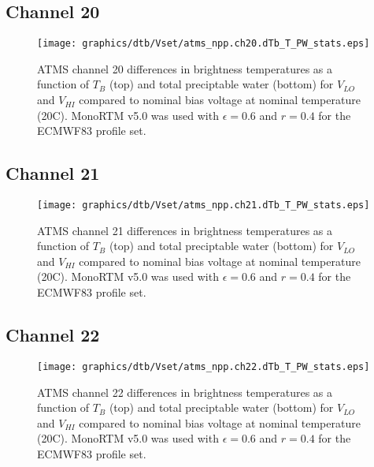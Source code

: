 \subsection{Channel 20}
\begin{figure}[H]
  \label{fig:Vset.ch20_dtb}
  \centering
  \hspace{1.5cm}\texttt{[image: graphics/dtb/Vset/atms\_npp.ch20.dTb\_T\_PW\_stats.eps]}
  \caption{ATMS channel 20 differences in brightness temperatures as a function of $T_B$ (top) and total preciptable water (bottom) for $V_{LO}$ and $V_{HI}$ compared to nominal bias voltage at nominal temperature (20\textdegree{}C). MonoRTM v5.0 was used with $\epsilon=0.6$ and $r=0.4$ for the ECMWF83 profile set.}
\end{figure}

\subsection{Channel 21}
\begin{figure}[H]
  \label{fig:Vset.ch21_dtb}
  \centering
  \hspace{1.5cm}\texttt{[image: graphics/dtb/Vset/atms\_npp.ch21.dTb\_T\_PW\_stats.eps]}
  \caption{ATMS channel 21 differences in brightness temperatures as a function of $T_B$ (top) and total preciptable water (bottom) for $V_{LO}$ and $V_{HI}$ compared to nominal bias voltage at nominal temperature (20\textdegree{}C). MonoRTM v5.0 was used with $\epsilon=0.6$ and $r=0.4$ for the ECMWF83 profile set.}
\end{figure}

\subsection{Channel 22}
\begin{figure}[H]
  \label{fig:Vset.ch22_dtb}
  \centering
  \hspace{1.5cm}\texttt{[image: graphics/dtb/Vset/atms\_npp.ch22.dTb\_T\_PW\_stats.eps]}
  \caption{ATMS channel 22 differences in brightness temperatures as a function of $T_B$ (top) and total preciptable water (bottom) for $V_{LO}$ and $V_{HI}$ compared to nominal bias voltage at nominal temperature (20\textdegree{}C). MonoRTM v5.0 was used with $\epsilon=0.6$ and $r=0.4$ for the ECMWF83 profile set.}
\end{figure}

